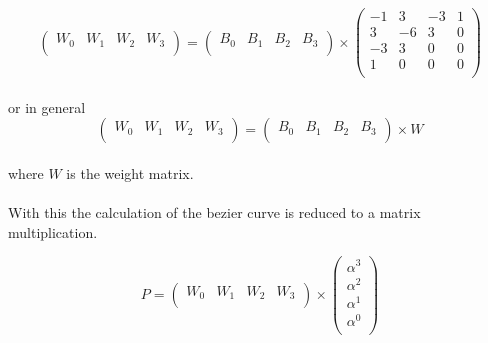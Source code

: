 \begin{equation*}
    \left(
    \begin{array}{cccc}
        W_0 & W_1 & W_2 & W_3 \\
    \end{array}
    \right)
    =
    \left(
    \begin{array}{cccc}
        B_0 & B_1 & B_2 & B_3 \\
    \end{array}
    \right)
    \times
    \left(
    \begin{array}{cccc}
        -1 & 3  & -3 & 1 \\
        3  & -6 & 3  & 0 \\
        -3 & 3  & 0  & 0 \\
        1  & 0  & 0  & 0 \\
    \end{array}
    \right)
\end{equation*}
\\
or in general
\\
\begin{equation*}
    \left(
    \begin{array}{cccc}
        W_0 & W_1 & W_2 & W_3 \\
    \end{array}
    \right)
    =
    \left(
    \begin{array}{cccc}
        B_0 & B_1 & B_2 & B_3 \\
    \end{array}
    \right)
    \times
    W
\end{equation*}
\\
where $W$ is the weight matrix.
\\\\
With this the calculation of the bezier curve is reduced to a matrix multiplication.

\begin{equation*}
    P=\left(
    \begin{array}{cccc}
        W_0 & W_1 & W_2 & W_3 \\
    \end{array}
    \right)
    \times
    \left(
    \begin{array}{cccc}
        \alpha ^3 \\
        \alpha ^2 \\
        \alpha ^1 \\
        \alpha ^0 \\
    \end{array}
    \right)
\end{equation*}

